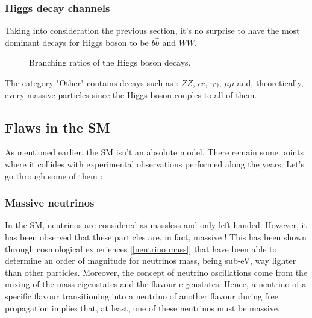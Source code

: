 \documentclass [12pt] {article}
\numberwithin{equation}{section} %
\numberwithin{figure}{section}   %
\begin{document}
\subsubsection*{Higgs decay channels}

Taking into consideration the previous section, it's no surprise to have the most dominant decays for Higgs boson to be $b \Bar{b}$ and $WW$. 


\begin{figure}[H]
    \centering
    \caption{Branching ratios of the Higgs boson decays.}
    \label{h decay}
\end{figure}

The category "Other" contains decays such as : $ZZ$, $cc$, $\gamma \gamma$, $\mu \mu$ and, theoretically, every massive particles since the Higgs boson couples to all of them.

\subsection{Flaws in the SM}

As mentioned earlier, the SM isn't an absolute model. There remain some points where it collides with experimental observations performed along the years. Let's go through some of them :

\subsubsection*{Massive neutrinos}

In the SM, neutrinos are considered as massless and only left-handed. However, it has been observed that these particles are, in fact, massive ! This has been shown through cosmological experiences [\ref{neutrino mass}] that have been able to determine an order of magnitude for neutrinos mass, being sub-eV, way lighter than other particles. Moreover, the concept of neutrino oscillations come from the mixing of the mass eigenstates and the flavour eigenstates. Hence, a neutrino of a specific flavour transitioning into a neutrino of another flavour during free propagation implies that, at least, one of these neutrinos must be massive. \\
\end{document}
